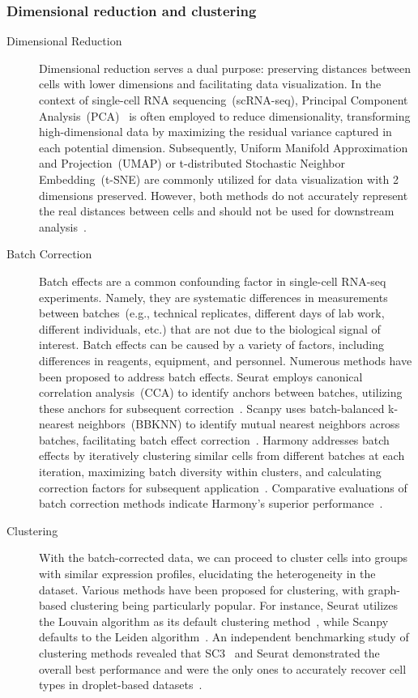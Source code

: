 \subsubsection{Dimensional reduction and clustering}
\label{background:sec2:dr_n_clustering}
\begin{description}
	\item[Dimensional Reduction]
	Dimensional reduction serves a dual purpose: preserving distances between cells with lower dimensions and facilitating data visualization. In the context of single-cell RNA sequencing~(scRNA-seq), Principal Component Analysis~(PCA)~\citep{hotelling1933pca} is often employed to reduce dimensionality, transforming high-dimensional data by maximizing the residual variance captured in each potential dimension. Subsequently, Uniform Manifold Approximation and Projection~(UMAP) or t-distributed Stochastic Neighbor Embedding~(t-SNE) are commonly utilized for data visualization with 2 dimensions preserved. However, both methods do not accurately represent the real distances between cells and should not be used for downstream analysis~\citep{mcinnes2018umap, van2008tsne}.

	\item[Batch Correction]
	Batch effects are a common confounding factor in single-cell RNA-seq experiments. Namely, they are systematic differences in measurements between batches~(e.g., technical replicates, different days of lab work, different individuals, etc.) that are not due to the biological signal of interest. Batch effects can be caused by a variety of factors, including differences in reagents, equipment, and personnel. Numerous methods have been proposed to address batch effects. Seurat employs canonical correlation analysis~(CCA) to identify anchors between batches, utilizing these anchors for subsequent correction~\citep{stuart2019seurat3}. Scanpy uses batch-balanced k-nearest neighbors~(BBKNN) to identify mutual nearest neighbors across batches, facilitating batch effect correction~\citep{polanski2020bbknn}. Harmony addresses batch effects by iteratively clustering similar cells from different batches at each iteration, maximizing batch diversity within clusters, and calculating correction factors for subsequent application~\citep{korsunsky2019harmony}. Comparative evaluations of batch correction methods indicate Harmony's superior performance~\citep{tran2020benchmark}.

	\item[Clustering]
	With the batch-corrected data, we can proceed to cluster cells into groups with similar expression profiles, elucidating the heterogeneity in the dataset. Various methods have been proposed for clustering, with graph-based clustering being particularly popular. For instance, Seurat utilizes the Louvain algorithm as its default clustering method~\citep{stuart2019seurat3}, while Scanpy defaults to the Leiden algorithm~\citep{traag2019louvain}. An independent benchmarking study of clustering methods revealed that SC3~\citep{kiselev2017sc3} and Seurat demonstrated the overall best performance and were the only ones to accurately recover cell types in droplet-based datasets~\citep{duo2018benchclustering}.

\end{description}

